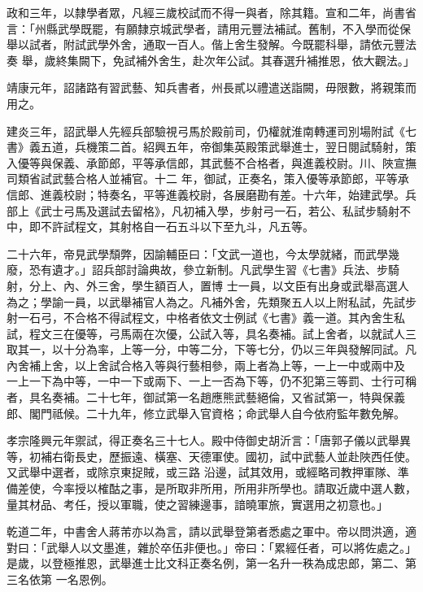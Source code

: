 \begin{pinyinscope}
 政和三年，以隸學者眾，凡經三歲校試而不得一與者，除其籍。宣和二年，尚書省言：「州縣武學既罷，有願隸京城武學者，請用元豐法補試。舊制，不入學而從保舉以試者，附試武學外舍，通取一百人。偕上舍生發解。今既罷科舉，請依元豐法奏
 舉，歲終集闕下，免試補外舍生，赴次年公試。其春選升補推恩，依大觀法。」



 靖康元年，詔諸路有習武藝、知兵書者，州長貳以禮遣送詣闕，毋限數，將親策而用之。



 建炎三年，詔武舉人先經兵部驗視弓馬於殿前司，仍權就淮南轉運司別場附試《七書》義五道，兵機策二首。紹興五年，帝御集英殿策武舉進士，翌日閱試騎射，策入優等與保義、承節郎，平等承信郎，其武藝不合格者，與進義校尉。川、陜宣撫司類省試武藝合格人並補官。十二
 年，御試，正奏名，策入優等承節郎，平等承信郎、進義校尉；特奏名，平等進義校尉，各展磨勘有差。十六年，始建武學。兵部上《武士弓馬及選試去留格》，凡初補入學，步射弓一石，若公、私試步騎射不中，即不許試程文，其射格自一石五斗以下至九斗，凡五等。



 二十六年，帝見武學頹弊，因諭輔臣曰：「文武一道也，今太學就緒，而武學幾廢，恐有遺才。」詔兵部討論典故，參立新制。凡武學生習《七書》兵法、步騎射，分上、內、外三舍，學生額百人，置博
 士一員，以文臣有出身或武舉高選人為之；學諭一員，以武舉補官人為之。凡補外舍，先類聚五人以上附私試，先試步射一石弓，不合格不得試程文，中格者依文士例試《七書》義一道。其內舍生私試，程文三在優等，弓馬兩在次優，公試入等，具名奏補。試上舍者，以就試人三取其一，以十分為率，上等一分，中等二分，下等七分，仍以三年與發解同試。凡內舍補上舍，以上舍試合格入等與行藝相參，兩上者為上等，一上一中或兩中及
 一上一下為中等，一中一下或兩下、一上一否為下等，仍不犯第三等罰、士行可稱者，具名奏補。二十七年，御試第一名趙應熊武藝絕倫，又省試第一，特與保義郎、閣門祗候。二十九年，修立武舉入官資格；命武舉人自今依府監年數免解。



 孝宗隆興元年禦試，得正奏名三十七人。殿中侍御史胡沂言：「唐郭子儀以武舉異等，初補右衛長史，歷振遠、橫塞、天德軍使。國初，試中武藝人並赴陜西任使。又武舉中選者，或除京東捉賊，或三路
 沿邊，試其效用，或經略司教押軍隊、準備差使，今率授以榷酤之事，是所取非所用，所用非所學也。請取近歲中選人數，量其材品、考任，授以軍職，使之習練邊事，諳曉軍旅，實選用之初意也。」



 乾道二年，中書舍人蔣芾亦以為言，請以武舉登第者悉處之軍中。帝以問洪適，適對曰：「武舉人以文墨進，雜於卒伍非便也。」帝曰：「累經任者，可以將佐處之。」是歲，以登極推恩，武舉進士比文科正奏名例，第一名升一秩為成忠郎，第二、第三名依第
 一名恩例。




\end{pinyinscope}
